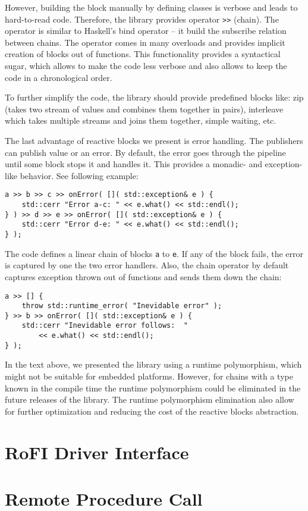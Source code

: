 However, building the block manually by defining classes is verbose and leads to
hard-to-read code. Therefore, the library provides operator
\texttt{>>} (chain). The operator is similar to Haskell's
bind operator -- it build the subscribe relation between chains. The operator
comes in many overloads and provides implicit creation of blocks out of
functions. This functionality provides a syntactical sugar, which allows to make
the code less verbose and also allows to keep the code in a chronological order.

To further simplify the code, the library should provide predefined blocks like:
zip (takes two stream of values and combines them together in pairs), interleave
which takes multiple streams and joins them together, simple waiting, etc.

The last advantage of reactive blocks we present is error handling. The
publishers can publish value or an error. By default, the error goes through the
pipeline until some block stops it and handles it. This provides a monadic- and
exception-like behavior. See following example:
\begin{verbatim}
a >> b >> c >> onError( []( std::exception& e ) {
    std::cerr "Error a-c: " << e.what() << std::endl();
} ) >> d >> e >> onError( []( std::exception& e ) {
    std::cerr "Error d-e: " << e.what() << std::endl();
} );
\end{verbatim}
The code defines a linear chain of blocks \texttt{a} to \texttt{e}. If any of
the block fails, the error is captured by one the two error handlers. Also, the
chain operator by default captures exception thrown out of functions and sends
them down the chain:
\begin{verbatim}
a >> [] {
    throw std::runtime_error( "Inevidable error" );
} >> b >> onError( []( std::exception& e ) {
    std::cerr "Inevidable error follows:  "
        << e.what() << std::endl();
} );
\end{verbatim}

In the text above, we presented the library using a runtime polymorphism, which
might not be suitable for embedded platforms. However, for chains with a type
known in the compile time the runtime polymorphism could be eliminated in the
future releases of the library. The runtime polymorphism elimination also allow
for further optimization and reducing the cost of the reactive blocks
abstraction.

\section{RoFI Driver Interface}

\section{Remote Procedure Call}